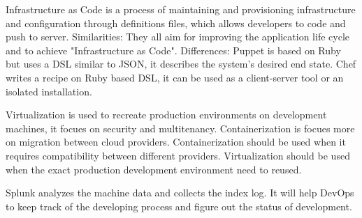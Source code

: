 \documentclass[12pt,letterpaper,boxed]{hmcpset}
\begin{document}
\begin{problem}
\end{problem}
Infrastructure as Code is a process of maintaining and provisioning infrastructure and configuration through definitions files, which allows developers to code and push to server.\newline
Similarities: They all aim for improving the application life cycle and to achieve "Infrastructure as Code". \newline
Differences: Puppet is based on Ruby but uses a DSL similar to JSON, it describes the system's desired end state. Chef writes a recipe on Ruby based DSL, it can be used as a client-server tool or an isolated installation.


\begin{problem}
\end{problem}
Virtualization is used to recreate production environments on development machines, it focues on security and multitenancy.\newline
Containerization is focues more on migration between cloud providers. \newline
Containerization should be used when it requires compatibility between different providers. Virtualization should be used when the exact production development environment need to reused.


\begin{problem}
\end{problem}
Splunk analyzes the machine data and collects the index log. It will help DevOps to keep track of the developing process and figure out the status of development. 
\end{document}
